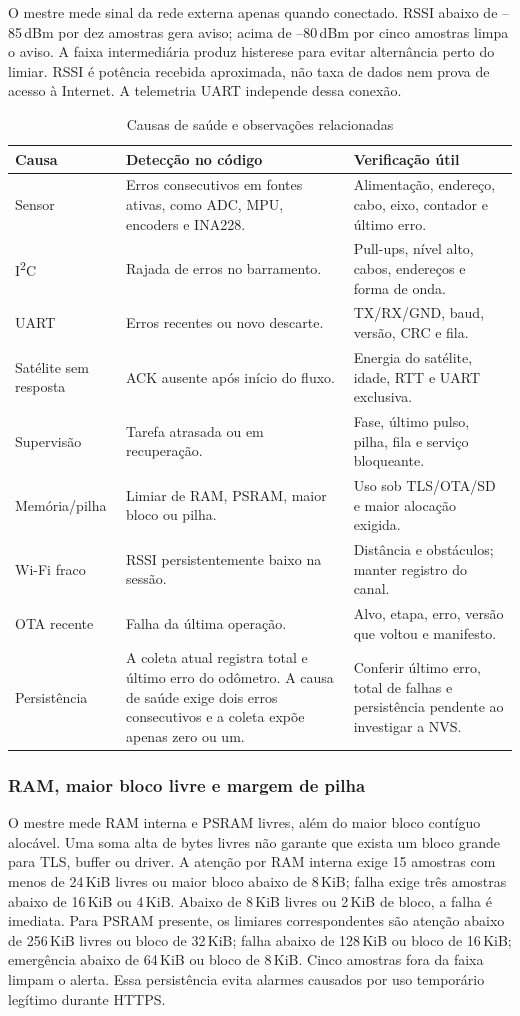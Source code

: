 O mestre mede sinal da rede externa apenas quando conectado. RSSI abaixo de --85\,dBm por dez amostras gera aviso; acima de --80\,dBm por cinco amostras limpa o aviso. A faixa intermediária produz histerese para evitar alternância perto do limiar. RSSI é potência recebida aproximada, não taxa de dados nem prova de acesso à Internet. A telemetria UART independe dessa conexão.

\begin{table}[htbp]\centering\small
\caption{Causas de saúde e observações relacionadas}\label{tab:causas-saude}
\begin{tabularx}{\textwidth}{@{}l X X@{}}\toprule
Causa & Detecção no código & Verificação útil\\\midrule
Sensor & Erros consecutivos em fontes ativas, como ADC, MPU, encoders e INA228. & Alimentação, endereço, cabo, eixo, contador e último erro.\\
I\textsuperscript{2}C & Rajada de erros no barramento. & Pull-ups, nível alto, cabos, endereços e forma de onda.\\
UART & Erros recentes ou novo descarte. & TX/RX/GND, baud, versão, CRC e fila.\\
Satélite sem resposta & ACK ausente após início do fluxo. & Energia do satélite, idade, RTT e UART exclusiva.\\
Supervisão & Tarefa atrasada ou em recuperação. & Fase, último pulso, pilha, fila e serviço bloqueante.\\
Memória/pilha & Limiar de RAM, PSRAM, maior bloco ou pilha. & Uso sob TLS/OTA/SD e maior alocação exigida.\\
Wi-Fi fraco & RSSI persistentemente baixo na sessão. & Distância e obstáculos; manter registro do canal.\\
OTA recente & Falha da última operação. & Alvo, etapa, erro, versão que voltou e manifesto.\\
Persistência & A coleta atual registra total e último erro do odômetro. A causa de saúde exige dois erros consecutivos e a coleta expõe apenas zero ou um. & Conferir último erro, total de falhas e persistência pendente ao investigar a NVS.\\\bottomrule
\end{tabularx}\end{table}

\subsubsection{RAM, maior bloco livre e margem de pilha}
O mestre mede RAM interna e PSRAM livres, além do maior bloco contíguo alocável. Uma soma alta de bytes livres não garante que exista um bloco grande para TLS, buffer ou driver. A atenção por RAM interna exige 15 amostras com menos de 24\,KiB livres ou maior bloco abaixo de 8\,KiB; falha exige três amostras abaixo de 16\,KiB ou 4\,KiB. Abaixo de 8\,KiB livres ou 2\,KiB de bloco, a falha é imediata. Para PSRAM presente, os limiares correspondentes são atenção abaixo de 256\,KiB livres ou bloco de 32\,KiB; falha abaixo de 128\,KiB ou bloco de 16\,KiB; emergência abaixo de 64\,KiB ou bloco de 8\,KiB. Cinco amostras fora da faixa limpam o alerta. Essa persistência evita alarmes causados por uso temporário legítimo durante HTTPS.

